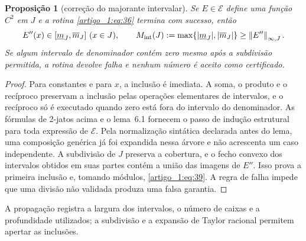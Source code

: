 \documentclass[12pt,a4paper]{article}
\theoremstyle{preciso}
\newtheorem{proposicao}[teorema]{Proposição}
\theoremstyle{definition}
\newcommand{\EE}{\mathcal E}
\newcommand{\normK}[2]{\left\|#1\right\|_{\infty,#2}}
\newcommand{\eqn}[2]{\begin{equation}\label{eq:#1}#2\end{equation}}
\theoremstyle{preciso}
\theoremstyle{preciso}
\theoremstyle{preciso}
\theoremstyle{preciso}
\theoremstyle{definition}
\theoremstyle{preciso}
\theoremstyle{definition}
\theoremstyle{preciso}
\theoremstyle{preciso}
\theoremstyle{definition}
\begin{document}
\begin{proposicao}[correção do majorante intervalar]\label{map:artigo_1:6.2}
Se $E\in\EE$ define uma função $C^2$ em $J$ e a rotina \eqref{artigo_1:eq:36} termina com sucesso, então
\eqn{39}{E''(x)\in[\underline m_J,\overline m_J]\ (x\in J),\qquad
M_{\rm int}(J):=\max\{|\underline m_J|,|\overline m_J|\}\ge\normK{E''}{J}.}
Se algum intervalo de denominador contém zero mesmo após a subdivisão permitida, a rotina devolve falha e nenhum número é aceito como certificado.
\end{proposicao}
\begin{proof}
Para constantes e para $x$, a inclusão é imediata. A soma, o produto e o recíproco preservam a inclusão pelas operações elementares de intervalos, e o recíproco só é executado quando zero está fora do intervalo do denominador. As fórmulas de 2-jatos acima e o lema~6.1 fornecem o passo de indução estrutural para toda expressão de $\EE$. Pela normalização sintática declarada antes do lema, uma composição genérica já foi expandida nessa árvore e não acrescenta um caso independente. A subdivisão de $J$ preserva a cobertura, e o fecho convexo dos intervalos obtidos em suas partes contém a união das imagens de $E''$. Isso prova a primeira inclusão e, tomando módulos, \eqref{artigo_1:eq:39}. A regra de falha impede que uma divisão não validada produza uma falsa garantia.
\end{proof}
A propagação registra a largura dos intervalos, o número de caixas e a profundidade utilizados; a subdivisão e a expansão de Taylor racional permitem apertar as inclusões.
\end{document}
